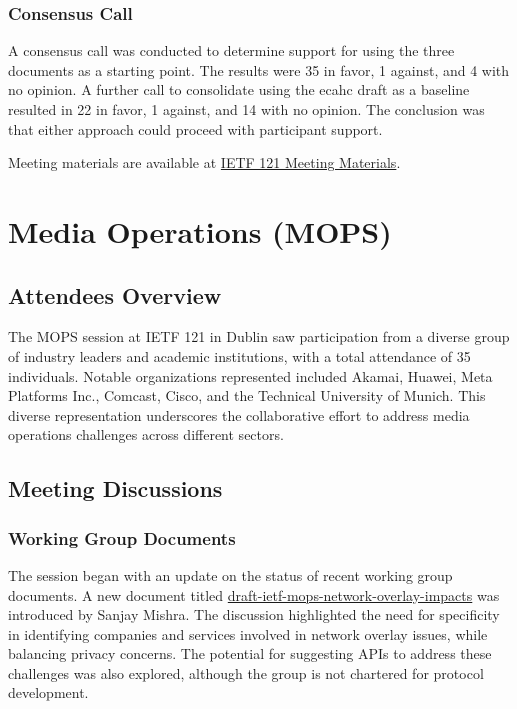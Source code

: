 \documentclass{article}
\begin{document}
\subsubsection{Consensus Call}
A consensus call was conducted to determine support for using the three documents as a starting point. The results were 35 in favor, 1 against, and 4 with no opinion. A further call to consolidate using the ecahc draft as a baseline resulted in 22 in favor, 1 against, and 14 with no opinion. The conclusion was that either approach could proceed with participant support.

Meeting materials are available at \href{https://datatracker.ietf.org/meeting/121/materials}{IETF 121 Meeting Materials}.


\newpage

\section{Media Operations (MOPS)}

\subsection{Attendees Overview}

The MOPS session at IETF 121 in Dublin saw participation from a diverse group of industry leaders and academic institutions, with a total attendance of 35 individuals. Notable organizations represented included Akamai, Huawei, Meta Platforms Inc., Comcast, Cisco, and the Technical University of Munich. This diverse representation underscores the collaborative effort to address media operations challenges across different sectors.

\subsection{Meeting Discussions}

\subsubsection{Working Group Documents}

The session began with an update on the status of recent working group documents. A new document titled \href{https://datatracker.ietf.org/doc/html/draft-deen-mops-network-overlay-impacts}{draft-ietf-mops-network-overlay-impacts} was introduced by Sanjay Mishra. The discussion highlighted the need for specificity in identifying companies and services involved in network overlay issues, while balancing privacy concerns. The potential for suggesting APIs to address these challenges was also explored, although the group is not chartered for protocol development.
\end{document}
